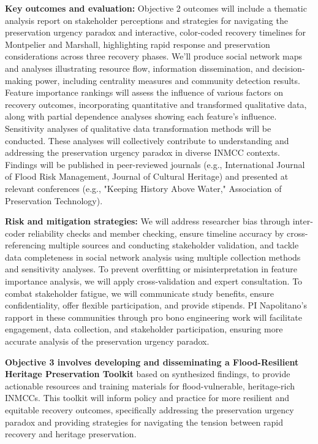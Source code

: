 \documentclass[11pt]{article}
\begin{document}
\textbf{Key outcomes and evaluation:}
Objective 2 outcomes will include a thematic analysis report on stakeholder perceptions and strategies for navigating the preservation urgency paradox and interactive, color-coded recovery timelines for Montpelier and Marshall, highlighting rapid response and preservation considerations across three recovery phases. 
We'll produce social network maps and analyses illustrating resource flow, information dissemination, and decision-making power, including centrality measures and community detection results. 
Feature importance rankings will assess the influence of various factors on recovery outcomes, incorporating quantitative and transformed qualitative data, along with partial dependence analyses showing each feature's influence. 
Sensitivity analyses of qualitative data transformation methods will be conducted. 
These analyses will collectively contribute to understanding and addressing the preservation urgency paradox in diverse INMCC contexts.
Findings will be published in peer-reviewed journals (e.g., International Journal of Flood Risk Management, Journal of Cultural Heritage) and presented at relevant conferences (e.g., "Keeping History Above Water," Association of Preservation Technology).

\textbf{Risk and mitigation strategies:}
We will address researcher bias through inter-coder reliability checks and member checking, ensure timeline accuracy by cross-referencing multiple sources and conducting stakeholder validation, and tackle data completeness in social network analysis using multiple collection methods and sensitivity analyses.
To prevent overfitting or misinterpretation in feature importance analysis, we will apply cross-validation and expert consultation. 
To combat stakeholder fatigue, we will communicate study benefits, ensure confidentiality, offer flexible participation, and provide stipends. 
PI Napolitano's rapport in these communities through pro bono engineering work will facilitate engagement, data collection, and stakeholder participation, ensuring more accurate analysis of the preservation urgency paradox.

\begin{tcolorbox}[colback=mycmykcolor, colframe=black, boxrule=1pt, coltext=black,left=1mm, right=1mm, top=1mm, bottom=1mm] \textbf{Objective 3 involves developing and disseminating a Flood-Resilient Heritage Preservation Toolkit} based on synthesized findings, to provide actionable resources and training materials for flood-vulnerable, heritage-rich INMCCs. This toolkit will inform policy and practice for more resilient and equitable recovery outcomes, specifically addressing the preservation urgency paradox and providing strategies for navigating the tension between rapid recovery and heritage preservation. \end{tcolorbox}
\end{document}
